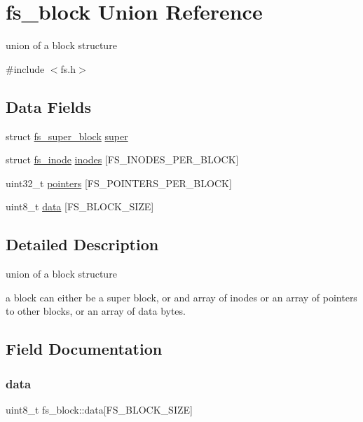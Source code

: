 \hypertarget{unionfs__block}{}\section{fs\+\_\+block Union Reference}
\label{unionfs__block}


union of a block structure  




{\ttfamily \#include $<$fs.\+h$>$}

\subsection*{Data Fields}
\begin{DoxyCompactItemize}
\item 
struct \mbox{\hyperlink{structfs__super__block}{fs\+\_\+super\+\_\+block}} \mbox{\hyperlink{unionfs__block_a567fd97fc6dbdbede24dba13bbe9fef5}{super}}
\item 
struct \mbox{\hyperlink{structfs__inode}{fs\+\_\+inode}} \mbox{\hyperlink{unionfs__block_a43d96d75f7ec8b76e489d7772057b7af}{inodes}} \mbox{[}F\+S\+\_\+\+I\+N\+O\+D\+E\+S\+\_\+\+P\+E\+R\+\_\+\+B\+L\+O\+CK\mbox{]}
\item 
uint32\+\_\+t \mbox{\hyperlink{unionfs__block_a9f65c017631624e8fd41f9b994ec33db}{pointers}} \mbox{[}F\+S\+\_\+\+P\+O\+I\+N\+T\+E\+R\+S\+\_\+\+P\+E\+R\+\_\+\+B\+L\+O\+CK\mbox{]}
\item 
uint8\+\_\+t \mbox{\hyperlink{unionfs__block_af4bcdadb505a03f48130efd7cf646f7b}{data}} \mbox{[}F\+S\+\_\+\+B\+L\+O\+C\+K\+\_\+\+S\+I\+ZE\mbox{]}
\end{DoxyCompactItemize}


\subsection{Detailed Description}
union of a block structure 

a block can either be a super block, or and array of inodes or an array of pointers to other blocks, or an array of data bytes. 

\subsection{Field Documentation}
\mbox{\label{unionfs__block_af4bcdadb505a03f48130efd7cf646f7b}} 
\subsubsection{\texorpdfstring{data}{data}}
{\footnotesize\ttfamily uint8\+\_\+t fs\+\_\+block\+::data\mbox{[}F\+S\+\_\+\+B\+L\+O\+C\+K\+\_\+\+S\+I\+ZE\mbox{]}}

